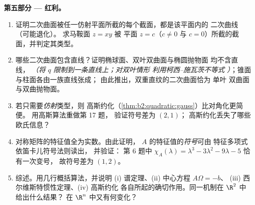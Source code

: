\begin{problem}
\medskip
\noindent\textbf{第五部分 --- 红利。}
\begin{enumerate}[resume]
  \item 证明二次曲面被任一仿射平面所截的每个截面，都是该平面内的
        二次曲线（可能退化）。
        求马鞍面 $z = xy$ 被
        平面 $z = c$（$c \neq 0$ 与 $c = 0$）所截的截面，并判定其类型。
  \item 哪些二次曲面包含直线？证明椭球面、双叶双曲面与椭圆抛物面
        均不含直线，
        \emph{（将 $q$ 限制到一条直线上；对双叶情形
        利用柯西–施瓦茨不等式
        ）}；锥面与柱面各由一族直线张成；
        由此推出，双重直纹的二次曲面恰为
        单叶
        双曲面与双曲抛物面。
  \item 若只需要\emph{仿射}类型，则
        高斯约化（\cref{thm:b2:quadratic:gauss}）比对角化更简便。
        用高斯算法重做第 17 题，
        验证符号差为 $(2, 1)$；
        高斯约化丢失了哪些欧氏信息？
  \item 对称矩阵的特征值全为实数。由此证明，
        $A$ 的特征值的\emph{符号}可由
        特征多项式依笛卡儿符号法则读出，
        并验证：
        第 6 题中 $\chi_A(\lambda) = \lambda^3 - 3\lambda^2
        - 9\lambda - 5$ 恰有一次变号，
        故符号差为 $(1, 2)$。
  \item 综述。用几行概括算法，并说明
        (i) 谱定理、(ii) 中心方程 $A\Omega = -b$、
        (iii) 西尔维斯特惯性定理、(iv) 高斯约化
        各自所起的确切作用。同一机制在
        $\R^2$ 中给出什么结果？
        在 $\R^n$ 中又有何变化？
\end{enumerate}
\end{problem}
